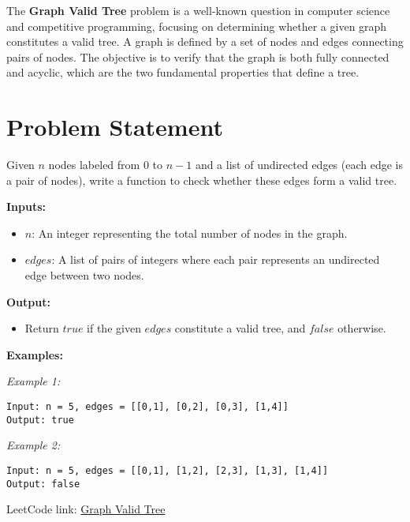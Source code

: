 
\label{problem:graph_valid_tree}

The \textbf{Graph Valid Tree} problem is a well-known question in computer science and competitive programming, focusing on determining whether a given graph constitutes a valid tree. A graph is defined by a set of nodes and edges connecting pairs of nodes. The objective is to verify that the graph is both fully connected and acyclic, which are the two fundamental properties that define a tree.

\section*{Problem Statement}

Given \( n \) nodes labeled from \( 0 \) to \( n-1 \) and a list of undirected edges (each edge is a pair of nodes), write a function to check whether these edges form a valid tree.

\textbf{Inputs:}
\begin{itemize}
    \item \( n \): An integer representing the total number of nodes in the graph.
    \item \( edges \): A list of pairs of integers where each pair represents an undirected edge between two nodes.
\end{itemize}

\textbf{Output:}
\begin{itemize}
    \item Return \( true \) if the given \( edges \) constitute a valid tree, and \( false \) otherwise.
\end{itemize}

\textbf{Examples:}

\textit{Example 1:}
\begin{verbatim}
Input: n = 5, edges = [[0,1], [0,2], [0,3], [1,4]]
Output: true
\end{verbatim}

\textit{Example 2:}
\begin{verbatim}
Input: n = 5, edges = [[0,1], [1,2], [2,3], [1,3], [1,4]]
Output: false
\end{verbatim}

LeetCode link: \href{https://leetcode.com/problems/graph-valid-tree/}{Graph Valid Tree}

